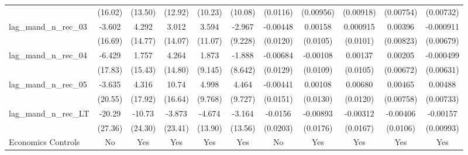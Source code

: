 {\begin{longtable}{l*{10}{c}}
                    &     (16.02)         &     (13.50)         &     (12.92)         &     (10.23)         &     (10.08)         &    (0.0116)         &   (0.00956)         &   (0.00918)         &   (0.00754)         &   (0.00732)         \\
[1em]
lag\_mand\_n\_rec\_03   &      -3.602         &       4.292         &       3.012         &       3.594         &      -2.967         &    -0.00448         &     0.00158         &    0.000915         &     0.00396         &   -0.000911         \\
                    &     (16.69)         &     (14.77)         &     (14.07)         &     (11.07)         &     (9.228)         &    (0.0120)         &    (0.0105)         &    (0.0101)         &   (0.00823)         &   (0.00679)         \\
[1em]
lag\_mand\_n\_rec\_04   &      -6.429         &       1.757         &       4.264         &       1.873         &      -1.888         &    -0.00684         &    -0.00108         &     0.00137         &     0.00205         &   -0.000499         \\
                    &     (17.83)         &     (15.43)         &     (14.80)         &     (9.145)         &     (8.642)         &    (0.0129)         &    (0.0109)         &    (0.0105)         &   (0.00672)         &   (0.00631)         \\
[1em]
lag\_mand\_n\_rec\_05   &      -3.635         &       4.316         &       10.74         &       4.998         &       4.464         &    -0.00441         &     0.00108         &     0.00680         &     0.00465         &     0.00488         \\
                    &     (20.55)         &     (17.92)         &     (16.64)         &     (9.768)         &     (9.727)         &    (0.0151)         &    (0.0130)         &    (0.0120)         &   (0.00758)         &   (0.00733)         \\
[1em]
lag\_mand\_n\_rec\_LT   &      -20.29         &      -10.73         &      -3.873         &      -4.674         &      -3.164         &     -0.0156         &    -0.00893         &    -0.00312         &    -0.00406         &    -0.00157         \\
                    &     (27.36)         &     (24.30)         &     (23.41)         &     (13.90)         &     (13.56)         &    (0.0203)         &    (0.0176)         &    (0.0167)         &    (0.0106)         &   (0.00993)         \\
[1em]
Economics Controls  &          No         &         Yes         &         Yes         &         Yes         &         Yes         &          No         &         Yes         &         Yes         &         Yes         &         Yes         \\

\end{longtable}}
